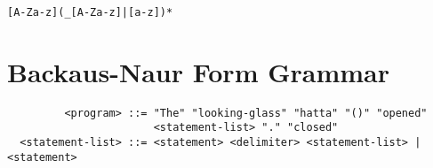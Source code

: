 \documentclass[a4, 11pt]{article}
\begin{document}
\begin{center}
  \texttt{[A-Za-z](_[A-Za-z]|[a-z])*}
\end{center}

\section*{Backaus-Naur Form Grammar}
\begin{verbatim}
         <program> ::= "The" "looking-glass" "hatta" "()" "opened" 
                       <statement-list> "." "closed"
  <statement-list> ::= <statement> <delimiter> <statement-list> | <statement>
\end{verbatim}
\end{document}
